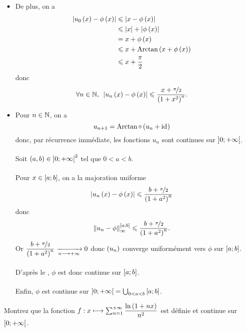 \begin{corr}
\begin{itemize}
    \item De plus, on a \[\begin{aligned}
        \left\lvert u_0\left(x\right)-\phi\left(x\right)\right\rvert&\leqslant\left\lvert x-\phi\left(x\right)\right\rvert \\
        &\leqslant\left\lvert x\right\rvert+\left\lvert\phi\left(x\right)\right\rvert \\
        &=x+\phi\left(x\right) \\
        &\leqslant x+\operatorname{Arctan}\left(x+\phi\left(x\right)\right) \\
        &\leqslant x+\dfrac{\pi}{2}
    \end{aligned}\] donc \[\quantifs{\forall n\in\N}\abs{u_n\paren{x}-\phi\paren{x}}\leq\dfrac{x+\nicefrac{\pi}{2}}{\paren{1+x^2}^n}.\]
    \item Pour \(n\in\mathbb{N}\), on a \[u_{n+1}=\operatorname{Arctan}\circ\left(u_n+\mathrm{id}_{}\right)\] donc, par récurrence immédiate, les fonctions \(u_n\) sont continues sur \(\left]0;+\infty\right[\). \\\\ Soit \(\left(a,b\right)\in\left]0;+\infty\right[^2\) tel que \(0<a<b\). \\\\ Pour \(x\in\left[a;b\right]\), on a la majoration uniforme \[\left\lvert u_n\left(x\right)-\phi\left(x\right)\right\rvert\leqslant\dfrac{b+\nicefrac{\pi}{2}}{\left(1+a^2\right)^n}\] donc \[\norme{u_n-\phi}_\infty^{\intervii{a}{b}}\leq\dfrac{b+\nicefrac{\pi}{2}}{\paren{1+a^2}^n}.\] Or \(\dfrac{b+\nicefrac{\pi}{2}}{\left(1+a^2\right)^n}\xrightarrow[n\longrightarrow+\infty]{}0\) donc \(\left(u_n\right)\) converge uniformément vers \(\phi\) sur \(\left[a;b\right]\). \\\\ D'après le , \(\phi\) est donc continue sur \(\left[a;b\right]\). \\\\ Enfin, \(\phi\) est continue sur \(\left]0;+\infty\right[=\bigcup_{0<a<b}\left[a;b\right]\).
\end{itemize}
\end{corr}

\begin{exo}
Montrez que la fonction \(f:x\longmapsto\sum_{n=1}^{+\infty}\dfrac{\ln\left(1+nx\right)}{n^2}\) est définie et continue sur \(\left[0;+\infty\right[\).
\end{exo}

